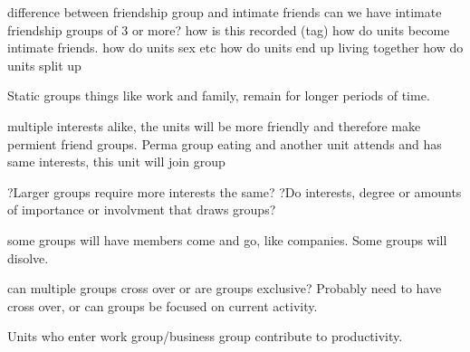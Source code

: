 difference between friendship group and intimate friends
can we have intimate friendship groups of 3 or more?
how is this recorded (tag)
how do units become intimate friends.
how do units sex etc
how do units end up living together
how do units split up



Static groups things like work and family, remain for longer periods of time.

multiple interests alike, the units will be more friendly and therefore make permient friend groups.
Perma group eating and another unit attends and has same interests, this unit will join group

?Larger groups require more interests the same?
?Do interests, degree or amounts of importance or involvment that draws groups?

some groups will have members come and go, like companies. 
Some groups will disolve.

can multiple groups cross over or are groups exclusive? Probably need to have cross over, or can groups be focused on current activity.


Units who enter work group/business group contribute to productivity. 




